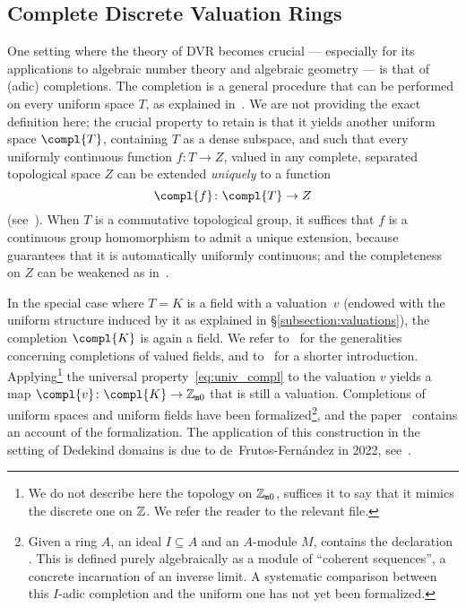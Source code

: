 \documentclass[sigplan,10pt,anonymous,review]{acmart}
\begin{document}
\subsection{Complete Discrete Valuation Rings}\label{subsec:complete_DVR}
One setting where the theory of DVR becomes crucial --- especially for its applications to algebraic number theory and algebraic geometry --- is that of (adic) completions. The completion is a general procedure that can be performed on every uniform space $T$, as explained in~\cite[Chapitre~II, \S3]{Bou71}. We are not providing the exact definition here; the crucial property to retain is that it yields another uniform space $\compl{T}$, containing $T$ as a dense subspace, and such that every uniformly continuous function $f\colon T \to Z$, valued in any complete, separated topological space $Z$ can be extended \emph{uniquely} to a function
\begin{equation}\label{eq:univ_compl}
\compl{f}\colon\compl{T}\rightarrow Z
\end{equation}
(see~\cite[Chapitre~II, \S3, n$^\circ$6, Théorème~2]{Bou71}). When $T$ is a commutative topological group, it suffices that $f$ is a continuous group homomorphism to admit a unique extension, because \cite[Chapitre~III, \S3, n$^\circ$1, Proposition~3]{Bou71} guarantees that it is automatically uniformly continuous; and the completeness on $Z$ can be weakened as in~\cite[Chapitre~I, \S8, n$^\circ$5, Théorème~1]{Bou71}.

In the special case where $T=K$ is a field with a valuation~$v$ (endowed with the uniform structure induced by it as explained in \S\ref{subsection:valuations}), the completion $\compl{K}$ is again a field. We refer to~\cite[Chapitre~VI, \S5, n$^\circ$3]{Bou85} for the generalities concerning completions of valued fields, and to~\cite[Chapitre~II, \S1]{Ser62} for a shorter introduction. Applying\footnote{We do not describe here the topology on $\mathbb{Z}_{\mathtt{m}0}$, suffices it to say that it mimics the discrete one on $\mathbb{Z}$. We refer the reader to the relevant \mathlib file\href{https://leanprover-community.github.io/mathlib_docs/topology/algebra/with_zero_topology.html}{\extlink}.} the universal property~\eqref{eq:univ_compl} to the valuation $v$ yields a map $\compl{v}\colon \compl{K}\rightarrow \wzmZZ$ that is still a valuation. Completions of uniform spaces and uniform fields have been formalized\footnote{Given a ring $A$, an ideal $I\subseteq A$ and an $A$-module $M$, \mathlib contains the declaration . This is defined purely algebraically as a module of ``coherent sequences'', a concrete incarnation of an inverse limit. A systematic comparison between this $I$-adic completion and the uniform one has not yet been formalized.}, and the paper~\cite{BuzComMas20} contains an account of the formalization. The application of this construction in the setting of Dedekind domains is due to de~Frutos-Fernández in 2022, see~\cite{deF22}. 
\end{document}
